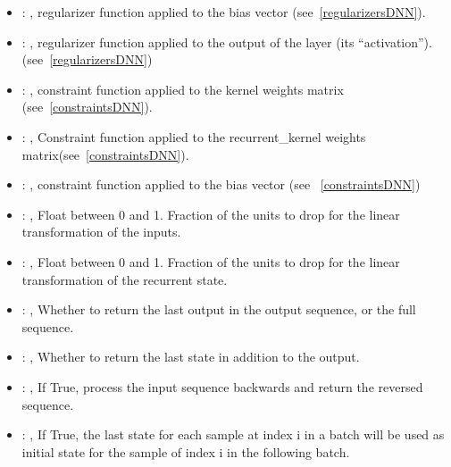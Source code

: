 \begin{itemize}
\begin{itemize}
        \item {}: , 
          regularizer function applied to the bias vector (see~\ref{regularizersDNN}).

        \item {}: , 
          regularizer function applied to the output         of the layer (its ``activation'').
          (see~\ref{regularizersDNN})

        \item {}: , 
          constraint function applied to the kernel weights matrix (see~\ref{constraintsDNN}).

        \item {}: , 
          Constraint function applied to the recurrent\_kernel weights
          matrix(see~\ref{constraintsDNN}).

        \item {}: , 
          constraint function applied to the bias vector (see ~\ref{constraintsDNN})

        \item {}: , 
          Float between 0 and 1. Fraction of the units to drop for the linear transformation of the
          inputs.

        \item {}: , 
          Float between 0 and 1. Fraction of the units to drop for the linear transformation of the
          recurrent state.

        \item {}: , 
          Whether to return the last output in the output sequence, or the full sequence.

        \item {}: , 
          Whether to return the last state in addition to the output.

        \item {}: , 
          If True, process the input sequence backwards and return the reversed sequence.

        \item {}: , 
          If True, the last state for each sample at index i in a batch will be used as initial
          state for the         sample of index i in the following batch.


\end{itemize}
\end{itemize}
